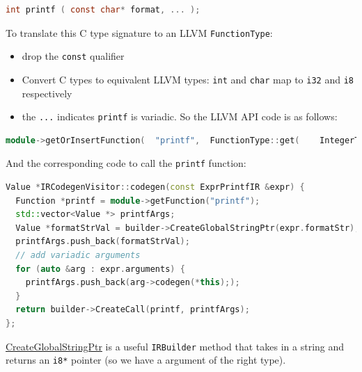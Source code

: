 \begin{lstlisting}[language=C]
int printf ( const char* format, ... );
\end{lstlisting}

To translate this C type signature to an LLVM \texttt{FunctionType}:

\begin{itemize}
\tightlist
\item
  drop the \texttt{const} qualifier
\item
  Convert C types to equivalent LLVM types: \texttt{int} and
  \texttt{char} map to \texttt{i32} and \texttt{i8} respectively
\item
  the \texttt{...} indicates \texttt{printf} is variadic. So the LLVM
  API code is as follows:
\end{itemize}

%

\begin{lstlisting}[language=C++,caption={extern\_functions\_codegen.cc}]
module->getOrInsertFunction(  "printf",  FunctionType::get(    IntegerType::getInt32Ty(*context),    Type::getInt8Ty(*context)->getPointerTo(),    true /* this is variadic func */  ));
\end{lstlisting}

And the corresponding code to call the \texttt{printf} function:

%

\begin{lstlisting}[caption={expr\_codegen.cc},language=C++]
Value *IRCodegenVisitor::codegen(const ExprPrintfIR &expr) {
  Function *printf = module->getFunction("printf");
  std::vector<Value *> printfArgs;
  Value *formatStrVal = builder->CreateGlobalStringPtr(expr.formatStr);
  printfArgs.push_back(formatStrVal);
  // add variadic arguments
  for (auto &arg : expr.arguments) {
    printfArgs.push_back(arg->codegen(*this););
  }
  return builder->CreateCall(printf, printfArgs);
};
\end{lstlisting}

\href{https://llvm.org/doxygen/classllvm_1_1IRBuilderBase.html\#abd2f5469db2235e00ac6df61fe766c85}{CreateGlobalStringPtr}
is a useful \texttt{IRBuilder} method that takes in a string and returns
an \texttt{i8*} pointer (so we have a argument of the right type).

